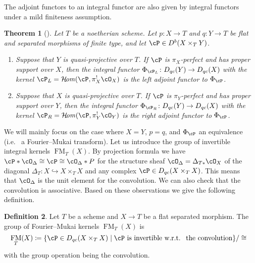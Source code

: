 \documentclass[12pt]{amsart}
\numberwithin{equation}{section}
\theoremstyle{plain}
\newtheorem{theorem}{Theorem}[section]
\theoremstyle{definition}
\newtheorem{definition}[theorem]{Definition}
\DeclareMathOperator{\CHom}{\mathcal{H}\!\mathit{om}}
\DeclareMathOperator{\FM}{\mathrm{FM}}
\begin{document}
The adjoint functors to an integral functor are also given by integral functors under a mild finiteness assumption.
\begin{theorem}[{\cite{MR3720794}}]\label{thm:adjoint-to-integral-functors}
    Let $T$ be a noetherian scheme.
    Let $p \colon X \to T$ and $q \colon Y \to T$ be flat and separated morphisms of finite type, and let $\cP \in D^b(X \times_T Y)$.
    \begin{enumerate}
        \item Suppose that $Y$ is quasi-projective over $T$. If $\cP$ is $\pi_X$-perfect and has proper support over $X$, then the integral functor $\Phi_{\cP_L} \colon D_{qc}(Y) \to D_{qc}(X)$ with the kernel $\cP_L = \CHom(\cP, \pi_X^!\cO_X)$ is the left adjoint functor to $\Phi_{\cP}$.
        \item Suppose that $X$ is quasi-projective over $T$. If $\cP$ is $\pi_Y$-perfect and has proper support over $Y$, then the integral functor $\Phi_{\cP_R} \colon D_{qc}(Y) \to D_{qc}(X)$ with the kernel $\cP_R = \CHom(\cP, \pi_Y^!\cO_Y)$ is the right adjoint functor to $\Phi_{\cP}$.
    \end{enumerate}
\end{theorem}


We will mainly focus on the case where $X = Y$, $p = q$, and $\Phi_{\cP}$ an equivalence (i.e.~ a Fourier--Mukai transform).
Let us introduce the group of invertible integral kernels $\FM_T(X)$.
By projection formula we have $\cP * \cO_{\Delta} \cong \cP \cong \cO_{\Delta} * P$ for the structure sheaf $\cO_{\Delta} = \Delta_{T*}\cO_X$ of the diagonal $\Delta_T \colon X \hookrightarrow X \times_T X$ and any complex $\cP \in D_{qc}(X \times_T X)$.
This means that $\cO_{\Delta}$ is the unit element for the convolution.
We can also check that the convolution is associative.
Based on these observations we give the following definition.
\begin{definition}
    Let $T$ be a scheme and $X \to T$ be a flat separated morphism.
    The group of Fourier--Mukai kernels $\FM_T(X)$ is
    \begin{equation}
        \FM_T(X) \coloneqq \{\cP \in D_{qc}(X \times_T X) \mid \text{$\cP$ is invertible w.r.t.~ the convolution}\}/\cong
    \end{equation}
    with the group operation being the convolution.
\end{definition}
\end{document}

